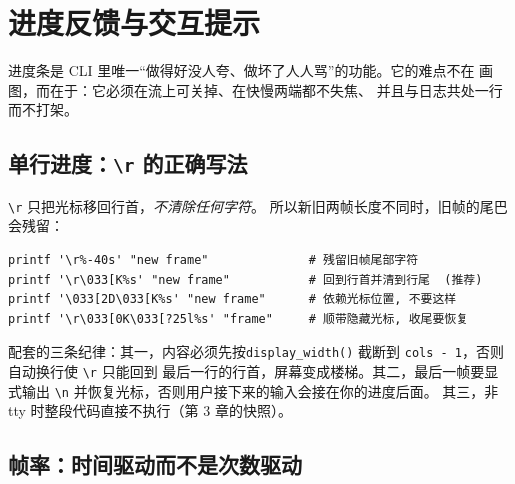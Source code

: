 \documentclass[12pt,a4paper,fontset=fandol]{ctexbook}
\newcommand{\Fn}[1]{\texttt{#1()}}
\newcommand{\Tp}[1]{\texttt{#1}}
\begin{document}
\chapter{进度反馈与交互提示}

进度条是 CLI 里唯一``做得好没人夸、做坏了人人骂''的功能。它的难点不在
画图，而在于：它必须在流上可关掉、在快慢两端都不失焦、
并且与日志共处一行而不打架。

\section{单行进度：\Tp{\textbackslash r} 的正确写法}

\Tp{\textbackslash r} 只把光标移回行首，\emph{不清除任何字符}。
所以新旧两帧长度不同时，旧帧的尾巴会残留：

\begin{lstlisting}[style=shellstyle,caption={清行的三种写法与各自的坑}]
printf '\r%-40s' "new frame"              # 残留旧帧尾部字符
printf '\r\033[K%s' "new frame"           # 回到行首并清到行尾  (推荐)
printf '\033[2D\033[K%s' "new frame"      # 依赖光标位置, 不要这样
printf '\r\033[0K\033[?25l%s' "frame"     # 顺带隐藏光标, 收尾要恢复
\end{lstlisting}

配套的三条纪律：其一，内容必须先按\Fn{display\_width} 截断到
\Tp{cols - 1}，否则自动换行使 \Tp{\textbackslash r} 只能回到
最后一行的行首，屏幕变成楼梯。其二，最后一帧要显式输出 \Tp{\textbackslash n}
并恢复光标，否则用户接下来的输入会接在你的进度后面。
其三，非 tty 时整段代码直接不执行（第 3 章的快照）。

\section{帧率：时间驱动而不是次数驱动}
\end{document}
